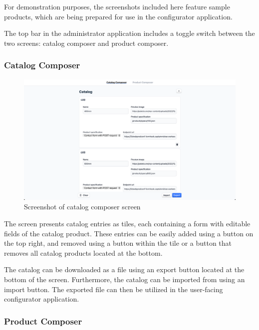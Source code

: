 For demonstration purposes, the screenshots included here feature sample products, which are being prepared for use in the configurator application.

The top bar in the administrator application includes a toggle switch between the two screens: catalog composer and product composer.


\subsubsection{Catalog Composer}

\begin{figure}[h!]
\centering
\includegraphics[width=\textwidth]{images/screenshot_catalogcomposer.png}
\caption{Screenshot of catalog composer screen}
\label{fig:screenshot-catalogcomposer}
\end{figure}


The screen presents catalog entries as tiles, each containing a form with editable fields of the catalog product. These entries can be easily added using a button on the top right, and removed using a button within the tile or a button that removes all catalog products located at the bottom.

The catalog can be downloaded as a  file using an export button located at the bottom of the screen. Furthermore, the catalog can be imported from  using an import button. The exported file can then be utilized in the user-facing configurator application.


\subsubsection{Product Composer}

